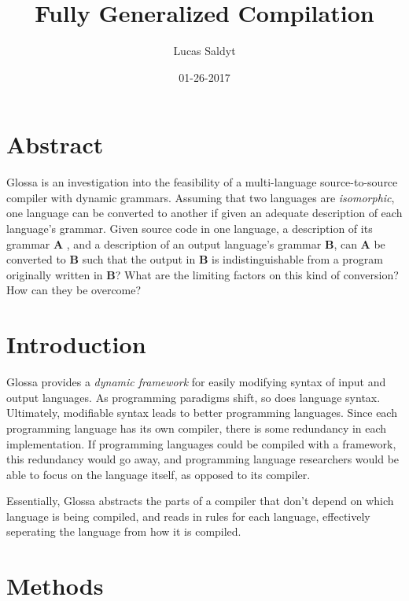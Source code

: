 \documentclass{article}
\title{Fully Generalized Compilation}
\date{01-26-2017}
\author{Lucas Saldyt}
\begin{document}
\maketitle
{}
\newpage
{}

\section{Abstract}
Glossa is an investigation into the feasibility of a multi-language source-to-source compiler with dynamic grammars. 
Assuming that two languages are \textit{isomorphic}, one language can be converted to another if given an adequate description of each language's grammar.
Given source code in one language, a description of its grammar \textbf{A} , and a description of an output language's grammar \textbf{B}, can \textbf{A} be converted to \textbf{B} such that the output in \textbf{B} is indistinguishable from a program originally written in \textbf{B}?
What are the limiting factors on this kind of conversion? 
How can they be overcome?

\section{Introduction}

Glossa provides a \textit{dynamic framework} for easily modifying syntax of input and output languages. 
As programming paradigms shift, so does language syntax. Ultimately, modifiable syntax leads to better programming languages. 
Since each programming language has its own compiler, there is some redundancy in each implementation. If programming languages could be compiled with a framework, this redundancy would go away, and programming language researchers would be able to focus on the language itself, as opposed to its compiler.

Essentially, Glossa abstracts the parts of a compiler that don't depend on which language is being compiled, and reads in rules for each language, effectively seperating the language from how it is compiled. 

\section{Methods}
\end{document}
